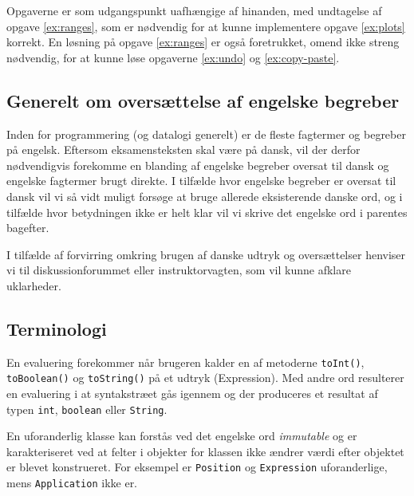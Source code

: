 Opgaverne er som udgangspunkt uafhængige af hinanden, med undtagelse af opgave
\ref{ex:ranges}, som er nødvendig for at kunne implementere opgave
\ref{ex:plots} korrekt. En løsning på opgave \ref{ex:ranges} er også
foretrukket, omend ikke streng nødvendig, for at kunne løse opgaverne
\ref{ex:undo} og \ref{ex:copy-paste}.

\subsection{Generelt om oversættelse af engelske begreber}

Inden for programmering (og datalogi generelt) er de fleste fagtermer
og begreber på engelsk. Eftersom eksamensteksten skal være på dansk,
vil der derfor nødvendigvis forekomme en blanding af engelske begreber
oversat til dansk og engelske fagtermer brugt direkte. I tilfælde hvor
engelske begreber er oversat til dansk vil vi så vidt muligt forsøge
at bruge allerede eksisterende danske ord, og i tilfælde hvor
betydningen ikke er helt klar vil vi skrive det engelske ord i
parentes bagefter.

I tilfælde af forvirring omkring brugen af danske udtryk og
oversættelser henviser vi til diskussionforummet eller
instruktorvagten, som vil kunne afklare uklarheder.

\subsection{Terminologi}

\begin{description}[\setleftmargin{60pt}\breaklabel\setlabelstyle{\it}]


\item [Evaluering] En evaluering forekommer når brugeren kalder en af metoderne
\texttt{toInt()}, \texttt{toBoolean()} og \texttt{toString()} på et udtryk
(Expression). Med andre ord resulterer en evaluering i at syntakstræet gås
igennem og der produceres et resultat af typen \texttt{int}, \texttt{boolean}
eller \texttt{String}.

\item [Uforanderlig] En uforanderlig klasse kan forstås ved det engelske ord
\textit{immutable} og er karakteriseret ved at felter i objekter for klassen
ikke ændrer værdi efter objektet er blevet konstrueret. For eksempel er
\texttt{Position} og \texttt{Expression} uforanderlige, mens
\texttt{Application} ikke er.

\end{description}

